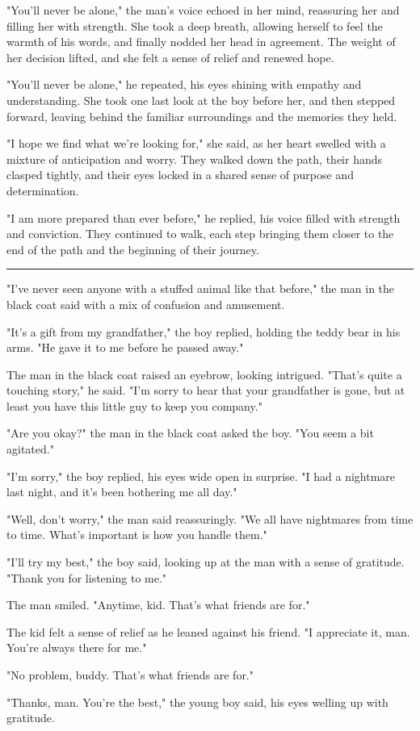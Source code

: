 \documentclass[smalldemyvopaper,11pt,twoside,onecolumn,openright,extrafontsizes]{memoir}
\begin{document}
"You'll never be alone," the man's voice echoed in her mind, reassuring her and filling her with strength. She took a deep breath, allowing herself to feel the warmth of his words, and finally nodded her head in agreement. The weight of her decision lifted, and she felt a sense of relief and renewed hope.\par
"You'll never be alone," he repeated, his eyes shining with empathy and understanding. She took one last look at the boy before her, and then stepped forward, leaving behind the familiar surroundings and the memories they held.\par
"I hope we find what we're looking for," she said, as her heart swelled with a mixture of anticipation and worry. They walked down the path, their hands clasped tightly, and their eyes locked in a shared sense of purpose and determination.\par
"I am more prepared than ever before," he replied, his voice filled with strength and conviction. They continued to walk, each step bringing them closer to the end of the path and the beginning of their journey.\par
\fancybreak{* * *}
"I've never seen anyone with a stuffed animal like that before," the man in the black coat said with a mix of confusion and amusement.\par
"It's a gift from my grandfather," the boy replied, holding the teddy bear in his arms. "He gave it to me before he passed away."\par
The man in the black coat raised an eyebrow, looking intrigued. "That's quite a touching story," he said. "I'm sorry to hear that your grandfather is gone, but at least you have this little guy to keep you company."\par
"Are you okay?" the man in the black coat asked the boy. "You seem a bit agitated."\par
"I'm sorry," the boy replied, his eyes wide open in surprise. "I had a nightmare last night, and it's been bothering me all day."\par
"Well, don't worry," the man said reassuringly. "We all have nightmares from time to time. What's important is how you handle them."\par
"I'll try my best," the boy said, looking up at the man with a sense of gratitude. "Thank you for listening to me."\par
The man smiled. "Anytime, kid. That's what friends are for."\par
The kid felt a sense of relief as he leaned against his friend. "I appreciate it, man. You're always there for me."\par
"No problem, buddy. That's what friends are for."\par
"Thanks, man. You're the best," the young boy said, his eyes welling up with gratitude.\par
\end{document}
